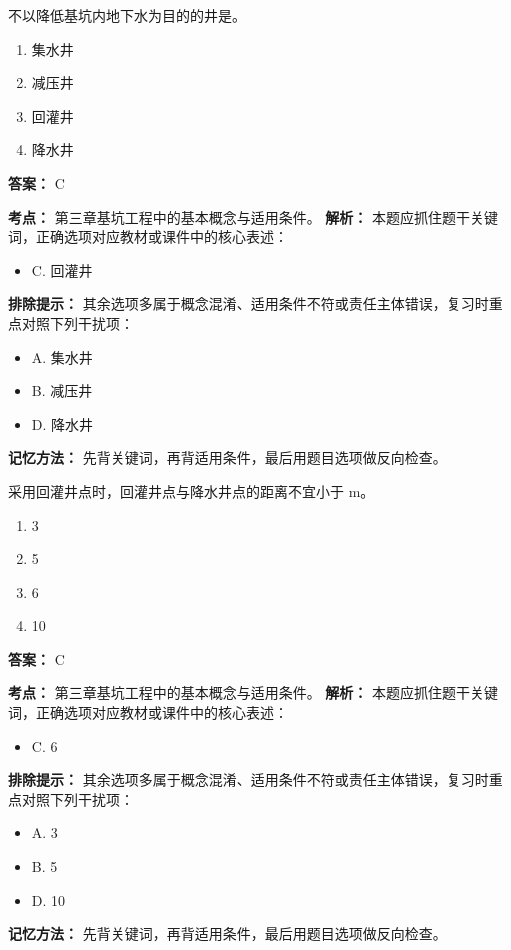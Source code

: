 \documentclass[UTF8,fontset=fandol,11pt]{ctexart}
\begin{document}
\begin{quizbox}[title={第 19 题}]
不以降低基坑内地下水为目的的井是。\\
\begin{enumerate}[label=\Alph*.]
\item 集水井
\item 减压井
\item 回灌井
\item 降水井
\end{enumerate}
\textbf{答案：} C
\vspace{0.25em}
\begin{answerbox}[title={考点解析}]
\textbf{考点：} 第三章基坑工程中的基本概念与适用条件。
\textbf{解析：} 本题应抓住题干关键词，正确选项对应教材或课件中的核心表述：
\begin{itemize}
\item C. 回灌井
\end{itemize}
\textbf{排除提示：} 其余选项多属于概念混淆、适用条件不符或责任主体错误，复习时重点对照下列干扰项：
\begin{itemize}
\item A. 集水井
\item B. 减压井
\item D. 降水井
\end{itemize}
\textbf{记忆方法：} 先背关键词，再背适用条件，最后用题目选项做反向检查。
\end{answerbox}
\end{quizbox}

\vspace{0.2em}

\begin{quizbox}[title={第 20 题}]
采用回灌井点时，回灌井点与降水井点的距离不宜小于 m。\\
\begin{enumerate}[label=\Alph*.]
\item 3
\item 5
\item 6
\item 10
\end{enumerate}
\textbf{答案：} C
\vspace{0.25em}
\begin{answerbox}[title={考点解析}]
\textbf{考点：} 第三章基坑工程中的基本概念与适用条件。
\textbf{解析：} 本题应抓住题干关键词，正确选项对应教材或课件中的核心表述：
\begin{itemize}
\item C. 6
\end{itemize}
\textbf{排除提示：} 其余选项多属于概念混淆、适用条件不符或责任主体错误，复习时重点对照下列干扰项：
\begin{itemize}
\item A. 3
\item B. 5
\item D. 10
\end{itemize}
\textbf{记忆方法：} 先背关键词，再背适用条件，最后用题目选项做反向检查。
\end{answerbox}
\end{quizbox}
\end{document}
